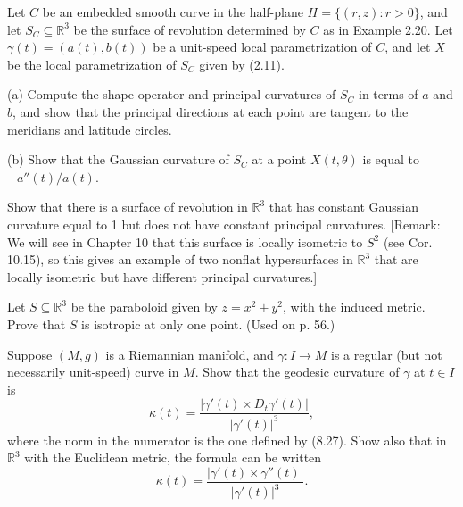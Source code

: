 \begin{exercise}
\label{prob:surface-revolution-shape-principal-curvatures}

Let $C$ be an embedded smooth curve in the half-plane $H = \{(r,z) : r > 0\}$, and let $S_C \subseteq \mathbb{R}^3$ be the surface of revolution determined by $C$ as in Example 2.20. Let $\gamma(t) = (a(t), b(t))$ be a unit-speed local parametrization of $C$, and let $X$ be the local parametrization of $S_C$ given by (2.11).

(a) Compute the shape operator and principal curvatures of $S_C$ in terms of $a$ and $b$, and show that the principal directions at each point are tangent to the meridians and latitude circles.

(b) Show that the Gaussian curvature of $S_C$ at a point $X(t,\theta)$ is equal to $-a''(t)/a(t)$.
\end{exercise}

\begin{exercise}
\label{prob:surface-revolution-constant-gaussian-curvature}

Show that there is a surface of revolution in $\mathbb{R}^3$ that has constant Gaussian curvature equal to 1 but does not have constant principal curvatures. [Remark: We will see in Chapter 10 that this surface is locally isometric to $S^2$ (see Cor. 10.15), so this gives an example of two nonflat hypersurfaces in $\mathbb{R}^3$ that are locally isometric but have different principal curvatures.]
\end{exercise}

\begin{exercise}
\label{prob:paraboloid-isotropic-one-point}

Let $S \subseteq \mathbb{R}^3$ be the paraboloid given by $z = x^2 + y^2$, with the induced metric. Prove that $S$ is isotropic at only one point. (Used on p. 56.)
\end{exercise}

\begin{exercise}
\label{prob:geodesic-curvature-non-unit-speed-curve}

Suppose $(M, g)$ is a Riemannian manifold, and $\gamma: I \to M$ is a regular (but not necessarily unit-speed) curve in $M$. Show that the geodesic curvature of $\gamma$ at $t \in I$ is
\[
\kappa(t) = \frac{|\gamma'(t) \times D_t \gamma'(t)|}{|\gamma'(t)|^3},
\]
where the norm in the numerator is the one defined by (8.27). Show also that in $\mathbb{R}^3$ with the Euclidean metric, the formula can be written
\[
\kappa(t) = \frac{|\gamma'(t) \times \gamma''(t)|}{|\gamma'(t)|^3}.
\]
\end{exercise}

